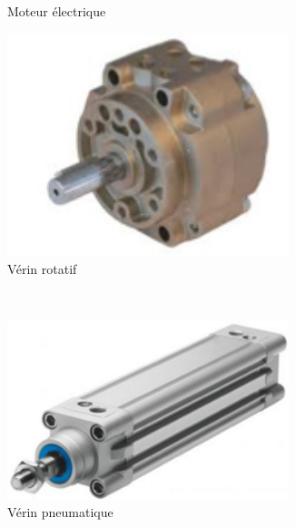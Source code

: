 \documentclass[10pt,fleqn]{article} %
\begin{document}
\begin{figure}[h]
\begin{subfigure}{0.25\textwidth}
    \caption{Moteur électrique}
  \end{subfigure}\hfill
  \begin{subfigure}{.25\textwidth}
    \centering
    \includegraphics[width=0.9\textwidth,height=.1\textheight,keepaspectratio]{images/verin_rotatif}
    \caption{Vérin rotatif}
  \end{subfigure}\\
  \begin{subfigure}{0.25\textwidth}
    \centering
    \includegraphics[width=0.9\textwidth,height=.1\textheight,keepaspectratio]{images/verin_pneu}
    \caption{Vérin pneumatique}
  \end{subfigure}\hfill
  \begin{subfigure}{.25\textwidth}
    \centering

\end{subfigure}
\end{figure}
\end{document}
